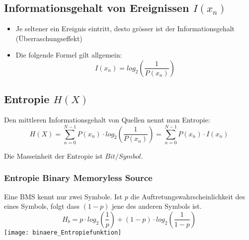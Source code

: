 \subsection{Informationsgehalt von Ereignissen $I(x_n)$}
\begin{itemize}
    \item Je seltener ein Ereignis eintritt, desto grösser ist der
    Informationsgehalt (Überraschungseffekt)
    \item Die folgende Formel gilt allgemein:
    \begin{equation*}
        I(x_n) = log_2(\frac{1}{P(x_n)})
    \end{equation*}
\end{itemize}
\subsection{Entropie $H(X)$}
Den mittleren Informationsgehalt von Quellen nennt man Entropie:
\begin{equation*}
    H(X) = \sum_{n=0}^{N-1} P(x_n) \cdot log_2(\frac{1}{P(x_n)}) = \sum_{n=0}^{N-1} P(x_n) \cdot I(x_n)
\end{equation*}

Die Masseinheit der Entropie ist $Bit/Symbol$.
\subsubsection{Entropie Binary Memoryless Source}
Eine BMS kennt nur zwei Symbole. Ist $p$ die Auftretungswahrscheinlichkeit des eines Symbols, folgt dass $(1-p)$ jene des anderen Symbols ist.
\begin{equation*}
    H_b = p  \cdot log_2(\frac{1}{p}) + (1-p)  \cdot log_2(\frac{1}{1-p})
\end{equation*}
\texttt{[image: binaere\_Entropiefunktion]}